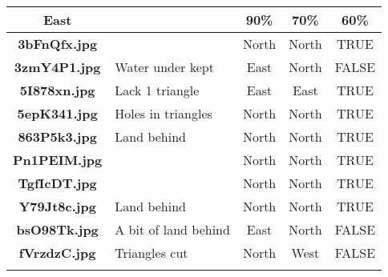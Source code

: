 \documentclass{article}
\begin{document}
\begin{table}[h!]
{\begin{tabular}{|c|p{4cm}|c|c|c|}
            \rowcolor{gray!40}
            \textbf{East}        &                              & 90\%                          & 70\%                             & 60\%                 \\ \hline
            \rowcolor{gray!0}
            \textbf{3bFnQfx.jpg} &                              & North                         & North                            & TRUE                 \\ \hline
            \rowcolor{gray!10}
            \textbf{3zmY4P1.jpg} & Water under kept             & East                          & North                            & FALSE                \\ \hline
            \rowcolor{gray!0}
            \textbf{5I878xn.jpg} & Lack 1 triangle              & East                          & East                             & TRUE                 \\ \hline
            \rowcolor{gray!10}
            \textbf{5epK341.jpg} & Holes in triangles           & North                         & North                            & TRUE                 \\ \hline
            \rowcolor{gray!0}
            \textbf{863P5k3.jpg} & Land behind                  & North                         & North                            & TRUE                 \\ \hline
            \rowcolor{gray!10}
            \textbf{Pn1PEIM.jpg} &                              & North                         & North                            & TRUE                 \\ \hline
            \rowcolor{gray!0}
            \textbf{TgfIcDT.jpg} &                              & North                         & North                            & TRUE                 \\ \hline
            \rowcolor{gray!10}
            \textbf{Y79Jt8c.jpg} & Land behind                  & North                         & North                            & TRUE                 \\ \hline
            \rowcolor{gray!0}
            \textbf{bsO98Tk.jpg} & A bit of land behind         & East                          & North                            & FALSE                \\ \hline
            \rowcolor{gray!10}
            \textbf{fVrzdzC.jpg} & Triangles cut                & North                         & West                             & FALSE                \\ \hline
            \rowcolor{gray!0}

\end{tabular}}
\end{table}
\end{document}
